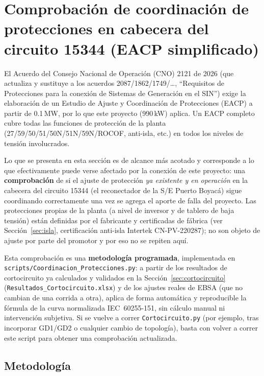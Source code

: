 \documentclass[11pt,a4paper]{article}
\begin{document}
\section{Comprobaci\'on de coordinaci\'on de protecciones en cabecera del circuito 15344 (EACP simplificado)}
\label{sec:eacp}

El Acuerdo del Consejo Nacional de Operaci\'on (CNO) 2121 de 2026 (que actualiza y sustituye a los acuerdos 2087/1862/1749/\ldots, ``Requisitos de Protecciones para la conexi\'on de Sistemas de Generaci\'on en el SIN'') exige la elaboraci\'on de un Estudio de Ajuste y Coordinaci\'on de Protecciones (EACP) a partir de 0.1\,MW, por lo que este proyecto (990\,kW) aplica. Un EACP completo cubre todas las funciones de protecci\'on de la planta (27/59/50/51/50N/51N/59N/ROCOF, anti-isla, etc.) en todos los niveles de tensi\'on involucrados.

Lo que se presenta en esta secci\'on es de alcance m\'as acotado y corresponde a lo que efectivamente puede verse afectado por la conexi\'on de este proyecto: una \textbf{comprobaci\'on} de si el ajuste de protecci\'on \emph{ya existente y en operaci\'on} en la cabecera del circuito 15344 (el reconectador de la S/E Puerto Boyac\'a) sigue coordinando correctamente una vez se agrega el aporte de falla del proyecto. Las protecciones propias de la planta (a nivel de inversor y de tablero de baja tensi\'on) est\'an definidas por el fabricante y certificadas de f\'abrica (ver Secci\'on~\ref{sec:isla}, certificaci\'on anti-isla Intertek CN-PV-220287); no son objeto de ajuste por parte del promotor y por eso no se repiten aqu\'i.

Esta comprobaci\'on es una \textbf{metodolog\'ia programada}, implementada en \texttt{scripts/Coordinacion\_Protecciones.py}: a partir de los resultados de cortocircuito ya calculados y validados en la Secci\'on~\ref{sec:cortocircuito} (\texttt{Resultados\_Cortocircuito.xlsx}) y de los ajustes reales de EBSA (que no cambian de una corrida a otra), aplica de forma autom\'atica y reproducible la f\'ormula de la curva normalizada IEC~60255-151, sin c\'alculo manual ni intervenci\'on subjetiva. Si se vuelve a correr \texttt{Cortocircuito.py} (por ejemplo, tras incorporar GD1/GD2 o cualquier cambio de topolog\'ia), basta con volver a correr este script para obtener una comprobaci\'on actualizada.

\subsection{Metodolog\'ia}
\end{document}
